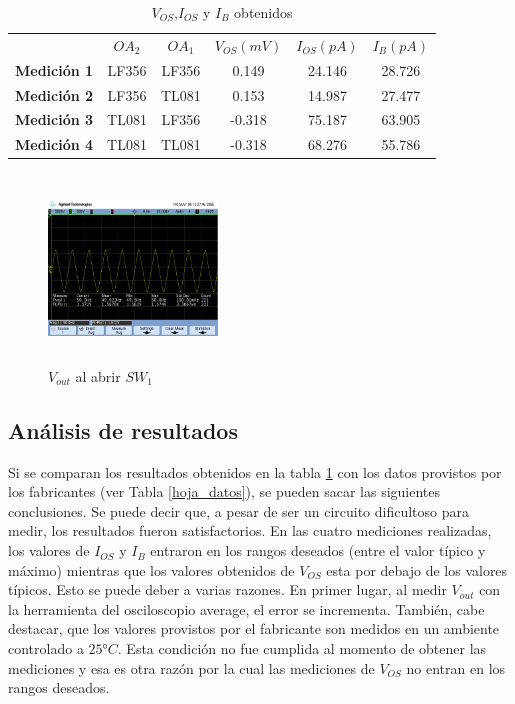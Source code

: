 \begin{table}[h!]
    \centering
    \caption{$V_{OS}$,$I_{OS}$ y $I_B$ obtenidos}
    \label{table5}
    \begin{tabular}{@{}cccccc@{}}
    \textbf{}           & \textbf{$OA_2$} & \textbf{$OA_1$} & \textbf{$V_{OS} (mV)$}   & \textbf{$I_{OS} (pA)$} & \textbf{$I_B (pA)$} \\ 
    \textbf{Medición 1} & LF356          & LF356      & 0.149                          & 24.146                 & 28.726             \\
    \textbf{Medición 2} & LF356          & TL081      & 0.153                          & 14.987                 & 27.477                  \\
    \textbf{Medición 3} & TL081          & LF356      & -0.318                         & 75.187                 & 63.905                  \\
    \textbf{Medición 4} & TL081          & TL081      & -0.318                         & 68.276                 & 55.786                  \\ 
    \end{tabular}
\end{table}

\begin{figure}[h!]                                                       
    \centering\includegraphics[width=0.4\textwidth, height=5cm]{../Ex3/Figuras/medicion.png}
     \caption{$V_{out}$ al abrir $SW_1$}
     \label{medicion}
     \end{figure}


\subsection{Análisis de resultados}
Si se comparan los resultados obtenidos en la tabla \ref{table5} con los datos provistos por los fabricantes (ver Tabla \ref{hoja_datos}), se pueden sacar las siguientes conclusiones. Se puede decir que, a pesar de 
ser un circuito dificultoso para medir, los resultados fueron satisfactorios. En las cuatro mediciones realizadas, los valores de $I_{OS}$ y $I_B$ entraron en los rangos deseados (entre el valor típico y máximo) mientras 
que los valores obtenidos de $V_{OS}$ esta por debajo de los valores típicos. Esto se puede deber a varias razones. En primer lugar, al medir $V_{out}$ con la herramienta del osciloscopio average, el error se incrementa. También, cabe destacar, que
los valores provistos por el fabricante son medidos en un ambiente controlado a $25 °C$. Esta condición no fue cumplida al momento de obtener las mediciones y esa es otra razón por la cual las mediciones de $V_{OS}$ no entran en los rangos deseados.   

